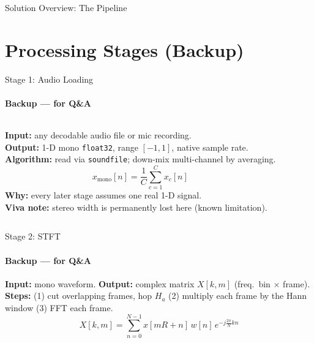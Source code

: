 \documentclass[aspectratio=169]{beamer}
\begin{document}
\begin{frame}{Solution Overview: The Pipeline}
{}
\end{frame}

\section{Processing Stages (Backup)}
\begin{frame}{Stage 1: Audio Loading}
  \framesubtitle{Backup --- for Q\&A}
  \begin{columns}[T]
      \textbf{Input:} any decodable audio file or mic recording.\\[4pt]
      \textbf{Output:} 1-D mono \texttt{float32}, range $[-1,1]$, native sample rate.\\[4pt]
      \textbf{Algorithm:} read via \texttt{soundfile}; down-mix multi-channel by averaging.
      \[ x_{\text{mono}}[n] = \frac{1}{C}\sum_{c=1}^{C} x_c[n] \]
      \small\textbf{Why:} every later stage assumes one real 1-D signal.\\[6pt]
      \small\textbf{Viva note:} stereo width is permanently lost here (known limitation).
  \end{columns}
\end{frame}

\begin{frame}{Stage 2: STFT}
  \framesubtitle{Backup --- for Q\&A}
  \textbf{Input:} mono waveform. \quad \textbf{Output:} complex matrix $X[k,m]$ (freq.\ bin $\times$ frame).\\[4pt]
  \textbf{Steps:} (1) cut overlapping frames, hop $H_a$ \; (2) multiply each frame by the Hann window \; (3) FFT each frame.
  \[ X[k,m] = \sum_{n=0}^{N-1} x[mR+n]\,w[n]\,e^{-j\frac{2\pi}{N}kn} \]
  \centering
\end{frame}
\end{document}
